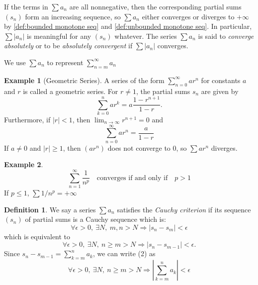 \documentclass[12pt, lettersize]{book}
\theoremstyle{plain}
\theoremstyle{definition}
\newtheorem{dfn}[thm]{Definition}
\newtheorem*{eg}{Example}
\theoremstyle{remark}
\begin{document}
	If the terms in $\sum a_n$ are all nonnegative, then the corresponding partial sums $(s_n)$ form an increasing sequence, so $\sum a_n$ either converges or diverges to $+\infty$ by \ref{def:bounded monotone seq} and \ref{def:unbounded monotone seq}. In particular, $\sum |a_n|$ is meaningful for any $(s_n)$ whatever. The series
	$\sum a_n$ is said to \emph{converge absolutely} or to be \emph{absolutely convergent} if $\sum |a_n|$ converges.
	
	We use $\sum a_n$ to represent $\sum_{n=m}^{\infty}a_n$
	
	\begin{eg}[Geometric Series]
		A series of the form $\sum_{n=0}^{\infty}ar^n$ for constants $a$ and $r$ is called a geometric series. For $r\neq1$,
		the partial sums $s_n$ are given by
		\begin{displaymath}
			\sum_{k=0}^{n}ar^k=a\frac{1-r^{n+1}}{1-r}.
		\end{displaymath}
		Furthermore, if $|r|<1$, then $\lim_{n\rightarrow \infty}r^{n+1}=0$ and
		\begin{displaymath}
			\sum_{n=0}^{\infty}ar^n=\frac{a}{1-r}
		\end{displaymath}
		If $a\neq0$ and $|r|\geq1$, then $(ar^n)$ does not converge to $0$, so $\sum ar^n$ diverges.
	\end{eg}
	
	\begin{eg}
		\begin{displaymath}
			\sum_{n=1}^{\infty}\frac{1}{n^p}\quad \text{converges if and only if}\quad p>1
		\end{displaymath}
		If $p\leq1$, $\sum1/n^p=+\infty$
	\end{eg}
	
	\setcounter{equation}{0}
	\begin{dfn}\label{def:cauchy criterion}
		We say a series $\sum a_n$ satisfies the \emph{Cauchy criterion} if its sequence $(s_n)$ of partial sums is a
		Cauchy sequence which is:
		\begin{equation}
			\forall\epsilon>0,\ \exists N,\ m,n>N\Rightarrow|s_n-s_m|<\epsilon
		\end{equation}
		which is equivalent to
		\begin{equation}
			\forall\epsilon>0,\ \exists N,\ n\geq m>N\Rightarrow|s_n-s_{m-1}|<\epsilon.
		\end{equation}
		Since $s_n-s_{m-1}=\sum_{k=m}^{n}a_k$, we can write (2) as
		\begin{equation}
			\forall\epsilon>0,\ \exists N,\ n\geq m>N\Rightarrow\left|\sum_{k=m}^{n}a_k\right|<\epsilon
		\end{equation}
	\end{dfn}
	
\end{document}
